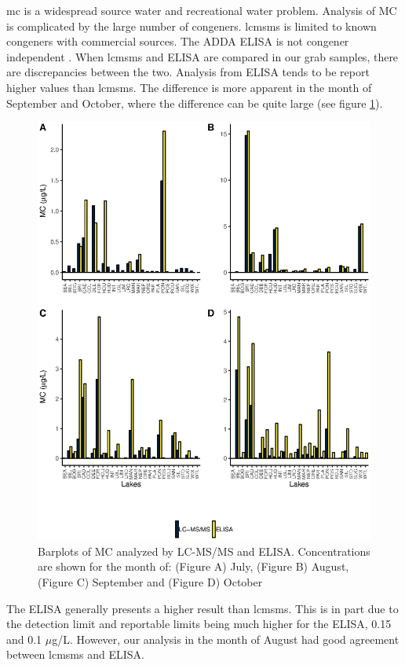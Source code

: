 \gls{mc} is a widespread source water and recreational water problem. Analysis of MC is complicated by the large number of congeners. \gls{lcmsms} is limited to known congeners with commercial sources. The ADDA ELISA is not congener independent \cite{he_varied_2017}. When \gls{lcmsms} and ELISA are compared in our grab samples, there are discrepancies between the two. Analysis from ELISA tends to be report higher values than \gls{lcmsms}. The difference is more apparent in the month of September and October, where the difference can be quite large (see figure \ref{fig:compare}). 
\begin{figure}[p]
	\includegraphics[width=\textwidth]{figures/compare}
	\caption{Barplots of MC analyzed by LC-MS/MS and ELISA. Concentrations are shown for the month of: (Figure A) July, (Figure B) August, (Figure C) September and (Figure D) October}
	\label{fig:compare}
\end{figure}
The ELISA generally presents a higher result than \gls{lcmsms}. This is in part due to the detection limit and reportable limits being much higher for the ELISA, 0.15 and 0.1 $\mu$g/L. However, our analysis in the month of August had good agreement between \gls{lcmsms} and ELISA. 

